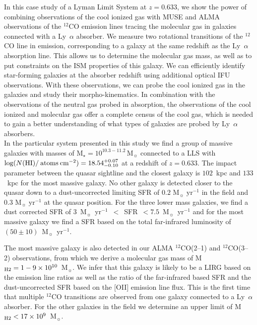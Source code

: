 \documentclass[a4paper,fleqn,usenatbib]{mnras}
\begin{document}
{%

In this case study of a Lyman Limit System at $z = 0.633$, we show the power of combining observations of the cool ionized gas with MUSE and ALMA observations of the $^{12}$CO emission lines tracing the molecular gas in galaxies connected with a Ly~$\alpha$ absorber. We measure two rotational transitions of the $^{12}$CO line in emission, corresponding to a galaxy at the same redshift as the Ly~$\alpha$ absorption line. This allows us to determine the molecular gas mass, as well as to put constraints on the ISM properties of this galaxy. We can efficiently identify star-forming galaxies at the absorber redshift using additional optical IFU observations. With these observations, we can probe the cool ionized gas in the galaxies and study their morpho-kinematics. In combination with the observations of the neutral gas probed in absorption, the observations of the cool ionized and molecular gas offer a complete census of the cool gas, which is needed to gain a better understanding of what types of galaxies are probed by Ly~$\alpha$ absorbers.\\

In the particular system presented in this study we find a group of massive galaxies with masses of M$_{\star} = 10^{10.3 - 11.2}\, \text{M}_{\sun}$ connected to a LLS with $\log ( N(\rm{HI}) / \: \text{atoms} \: \text{cm}^{-2}) = 18.54^{+0.07}_{-0.10}$ at a redshift of $z=0.633$. The impact parameter between the quasar sightline and the closest galaxy is $102$~kpc and $133$~kpc for the most massive galaxy. No other galaxy is detected closer to the quasar down to a dust-uncorrected limiting SFR of $0.2 \text{ M}_{\sun} \text{ yr}^{-1}$ in the field and $0.3 \text{ M}_{\sun} \text{ yr}^{-1}$ at the quasar position. For the three lower mass galaxies, we find a dust corrected SFR of $3$~M$_{\sun}$~yr$^{-1}$~$<$~SFR~$<7.5$~M$_{\sun}$~yr$^{-1}$ and for the most massive galaxy we find a SFR based on the total far-infrared luminosity of $(50 \pm 10)$~M$_{\sun}$~yr$^{-1}$.

The most massive galaxy is also detected in our ALMA $^{12}$CO(2--1) and $^{12}$CO(3--2) observations, from which we derive a molecular gas mass of M$_{\rm{H2}} = 1 - 9 \times 10^{10}$~M$_{\sun}$. We infer that this galaxy is likely to be a LIRG based on the emission line ratios as well as the ratio of the far-infrared based SFR and the dust-uncorrected SFR based on the $[$OII$]$ emission line flux. This is the first time that multiple $^{12}$CO transitions are observed from one galaxy connected to a Ly~$\alpha$ absorber. For the other galaxies in the field we determine an upper limit of M$_{\rm{H2}} < 17 \times 10^{9}$~M$_{\sun}$.

}
\end{document}

